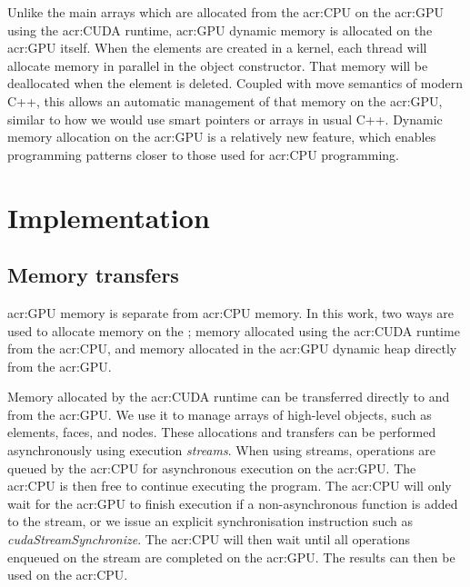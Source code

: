 Unlike the main arrays which are allocated from the \acrshort{acr:CPU} on the \acrshort{acr:GPU}
using the \acrshort{acr:CUDA} runtime, \acrshort{acr:GPU} dynamic memory is allocated on the
\acrshort{acr:GPU} itself. When the elements are created in a kernel, each thread will allocate
memory in parallel in the object constructor. That memory will be deallocated when the element is
deleted. Coupled with move semantics of modern C++, this allows an automatic management of that
memory on the \acrshort{acr:GPU}, similar to how we would use smart pointers or arrays in usual C++.
Dynamic memory allocation on the \acrshort{acr:GPU} is a relatively new feature, which enables
programming patterns closer to those used for \acrshort{acr:CPU} programming.

\section{Implementation}\label{section:graphics_processing_units:implementation}

\subsection{Memory transfers}\label{subsection:graphics_processing_units:implementation:memory}

\Acrshort{acr:GPU} memory is separate from \acrshort{acr:CPU} memory. In this work, two ways are
used to allocate memory on the ; memory allocated using the \acrshort{acr:CUDA}
runtime from the \acrshort{acr:CPU}, and memory allocated in the \acrshort{acr:GPU} dynamic heap
directly from the \acrshort{acr:GPU}.

Memory allocated by the \acrshort{acr:CUDA} runtime can be transferred directly to and from the
\acrshort{acr:GPU}. We use it to manage arrays of high-level objects, such as elements, faces, and
nodes. These allocations and transfers can be performed asynchronously using execution
\textit{streams}. When using streams, operations are queued by the \acrshort{acr:CPU} for
asynchronous execution on the \acrshort{acr:GPU}. The \acrshort{acr:CPU} is then free to continue
executing the program. The \acrshort{acr:CPU} will only wait for the \acrshort{acr:GPU} to finish
execution if a non-asynchronous function is added to the stream, or we issue an explicit
synchronisation instruction such as \textit{cudaStreamSynchronize}. The \acrshort{acr:CPU} will then
wait until all operations enqueued on the stream are completed on the \acrshort{acr:GPU}. The
results can then be used on the \acrshort{acr:CPU}.

